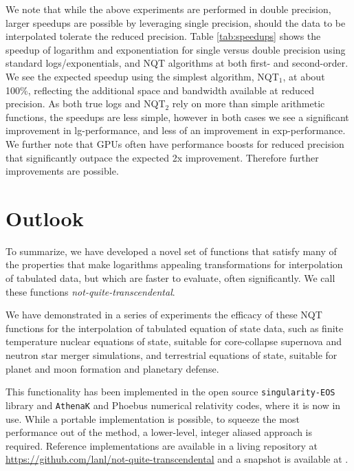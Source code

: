 \documentclass[linenumbers,twocolumn]{aastex631}
\begin{document}
We note that while the above experiments are performed in double precision, larger speedups are possible by leveraging single precision, should the data to be interpolated tolerate the reduced precision. Table \ref{tab:speedups} shows the speedup of logarithm and exponentiation for single versus double precision using standard logs/exponentials, and NQT algorithms at both first- and second-order. We see the expected speedup using the simplest algorithm, NQT$_1$, at about 100\%, reflecting the additional space and bandwidth available at reduced precision. As both true logs and NQT$_2$ rely on more than simple arithmetic functions, the speedups are less simple, however in both cases we see a significant improvement in lg-performance, and less of an improvement in exp-performance. We further note that GPUs often have performance boosts for reduced precision that significantly outpace the expected 2x improvement. Therefore further improvements are possible.

\section{Outlook}
\label{sec:outlook}

To summarize, we have developed a novel set of functions that satisfy many of the properties that make logarithms appealing transformations for interpolation of tabulated data, but which are faster to evaluate, often significantly. We call these functions \textit{not-quite-transcendental}.

We have demonstrated in a series of experiments the efficacy of these NQT functions for the interpolation of tabulated equation of state data, such as finite temperature nuclear equations of state, suitable for core-collapse supernova and neutron star merger simulations, and terrestrial equations of state, suitable for planet and moon formation and planetary defense. 

This functionality has been implemented in the open source {\tt singularity-EOS} \citep{singularityeos} library and {\tt AthenaK} \citep{StoneAthenaKBase,Zhu21DustOpacity,Fields24BNS} and Phoebus \citep{Phoebus} numerical relativity codes, where it is now in use. While a portable implementation is possible, to squeeze the most performance out of the method, a lower-level, integer aliased approach is required. Reference implementations are available in a living repository at \url{https://github.com/lanl/not-quite-transcendental} and a snapshot is available at \citet{NQTRepoZenodo}.
\end{document}
